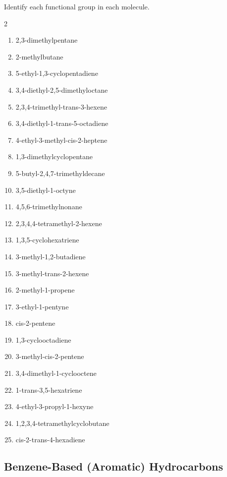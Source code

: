 \documentclass[12pt]{article}
\begin{document}
Identify each functional group in each molecule.
\begin{multicols}{2}
\begin{enumerate}[label=\alph*.]
    \item 2,3-dimethylpentane
    \item 2-methylbutane
    \item 5-ethyl-1,3-cyclopentadiene
    \item 3,4-diethyl-2,5-dimethyloctane
    \item 2,3,4-trimethyl-trans-3-hexene
    \item 3,4-diethyl-1-trans-5-octadiene
    \item 4-ethyl-3-methyl-cis-2-heptene
    \item 1,3-dimethylcyclopentane
    \item 5-butyl-2,4,7-trimethyldecane
    \item 3,5-diethyl-1-octyne
    \item 4,5,6-trimethylnonane
    \item 2,3,4,4-tetramethyl-2-hexene
    \item 1,3,5-cyclohexatriene
    \item 3-methyl-1,2-butadiene
    \item 3-methyl-trans-2-hexene
    \item 2-methyl-1-propene
    \item 3-ethyl-1-pentyne
    \item cis-2-pentene
    \item 1,3-cyclooctadiene
    \item 3-methyl-cis-2-pentene
    \item 3,4-dimethyl-1-cyclooctene
    \item 1-trans-3,5-hexatriene
    \item 4-ethyl-3-propyl-1-hexyne
    \item 1,2,3,4-tetramethylcyclobutane
    \item cis-2-trans-4-hexadiene
\end{enumerate}
\end{multicols}

\newpage

\begin{center}
    \subsection*{Benzene-Based (Aromatic) Hydrocarbons}
\end{center}
\end{document}
